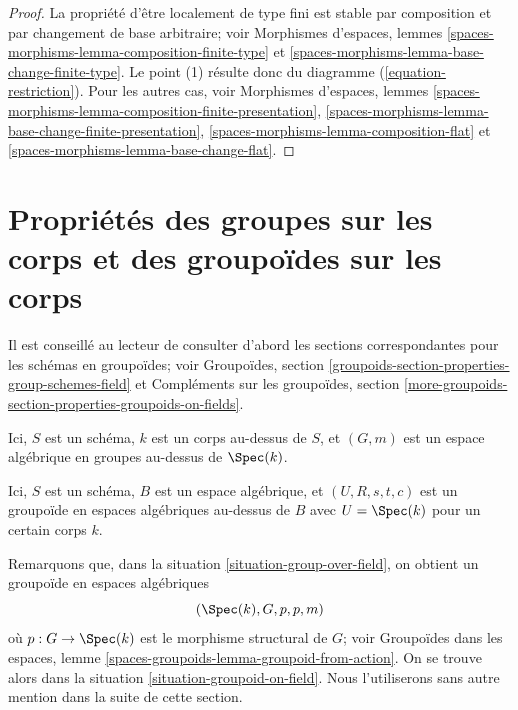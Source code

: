 \begin{proof}
La propriété d'être localement de type fini est stable par composition
et par changement de base arbitraire; voir
Morphismes d'espaces,
lemmes \ref{spaces-morphisms-lemma-composition-finite-type} et
\ref{spaces-morphisms-lemma-base-change-finite-type}.
Le point (1) résulte donc du diagramme (\ref{equation-restriction}).
Pour les autres cas, voir
Morphismes d'espaces,
lemmes \ref{spaces-morphisms-lemma-composition-finite-presentation},
\ref{spaces-morphisms-lemma-base-change-finite-presentation},
\ref{spaces-morphisms-lemma-composition-flat} et
\ref{spaces-morphisms-lemma-base-change-flat}.
\end{proof}









\section{Propriétés des groupes sur les corps et des groupoïdes sur les corps}
\label{section-properties-groupoids-on-fields}

\noindent
Il est conseillé au lecteur de consulter d'abord les sections correspondantes
pour les schémas en groupoïdes; voir
Groupoïdes, section \ref{groupoids-section-properties-group-schemes-field}
et
Compléments sur les groupoïdes,
section \ref{more-groupoids-section-properties-groupoids-on-fields}.

\begin{situation}
\label{situation-group-over-field}
Ici, $S$ est un schéma, $k$ est un corps au-dessus de $S$, et
$(G, m)$ est un espace algébrique en groupes au-dessus de $\Spec(k)$.
\end{situation}

\begin{situation}
\label{situation-groupoid-on-field}
Ici, $S$ est un schéma, $B$ est un espace algébrique, et
$(U, R, s, t, c)$ est un groupoïde en espaces algébriques au-dessus de $B$
avec $U = \Spec(k)$ pour un certain corps $k$.
\end{situation}

\noindent
Remarquons que, dans la
situation \ref{situation-group-over-field},
on obtient un groupoïde en espaces algébriques
\begin{equation}
\label{equation-groupoid-from-group}
(\Spec(k), G, p, p, m)
\end{equation}
où $p : G \to \Spec(k)$ est le morphisme structural de $G$; voir
Groupoïdes dans les espaces, lemme \ref{spaces-groupoids-lemma-groupoid-from-action}.
On se trouve alors dans la
situation \ref{situation-groupoid-on-field}.
Nous l'utiliserons sans autre mention dans la suite de cette section.

